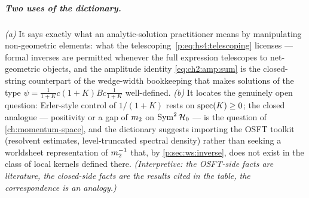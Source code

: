\subparagraph{Two uses of the dictionary.} \emph{(a)} It says exactly what an
analytic-solution practitioner means by manipulating non-geometric elements: what
the telescoping~\eqref{p:eq:hs4:telescoping} licenses --- formal inverses are permitted whenever the full expression
telescopes to net-geometric objects, and the amplitude identity \eqref{eq:ch2:amp:sum}
is the closed-string counterpart of the wedge-width bookkeeping that makes
solutions of the type $\psi=\frac{1}{1+K}c(1+K)Bc\frac{1}{1+K}$ well-defined.
\emph{(b)} It locates the genuinely open question: Erler-style control of
$1/(1+K)$ rests on $\operatorname{spec}(K)\ge0$; the closed analogue --- positivity or a gap of
$m_2$ on $\operatorname{Sym}^2\mathcal{H}_0$ --- is the question of \cref{ch:momentum-space}, and the dictionary suggests
importing the OSFT toolkit (resolvent estimates, level-truncated spectral density)
rather than seeking a worldsheet representation of $m_2^{-1}$ that, by
\cref{p:sec:ws:inverse}, does not exist in the class of local kernels defined there. \emph{(Interpretive: the OSFT-side facts are
literature, the closed-side facts are the results cited in the table, the correspondence is an
analogy.)}

